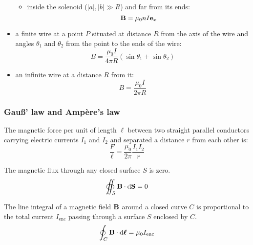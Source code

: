 \documentclass[../../../main.tex]{subfiles}
\begin{document}
\begin{multicols}{2}
\begin{prop}
\begin{itemize}
\begin{itemize}
\begin{center}
\begin{minipage}{\linewidth}
                                    \centering
                                    
                                \end{minipage}
                            \end{center}
                      \item inside the solenoid ($|a|,|b|\gg R$) and far from its ends: $$\boldsymbol{\mathrm{B}}=\mu_0 nI\boldsymbol{\mathrm{e}}_x$$
                  \end{itemize}
            \item a finite wire at a point $P$ situated at distance $R$ from the axis of the wire and angles $\theta_1$ and $\theta_2$ from the point to the ends of the wire: $$B=\frac{\mu_0I}{4\pi R}(\sin\theta_1+\sin\theta_2)$$
                  \begin{center}
                      \begin{minipage}{\linewidth}
                          \centering
                          
                      \end{minipage}
                  \end{center}
            \item an infinite wire at a distance $R$ from it: $$B=\frac{\mu_0I}{2\pi R}$$
        \end{itemize}
    \end{prop}
    \subsubsection{Gau\ss' law and Ampère's law}
    \begin{prop}
        The magnetic force per unit of length $\ell$ between two straight parallel conductors carrying electric currents $I_1$ and $I_2$ and separated a distance $r$ from each other is: $$\frac{F}{\ell}=\frac{\mu_0}{2\pi}\frac{I_1I_2}{r}$$
    \end{prop}
    \begin{law}
        The magnetic flux through any closed surface $S$ is zero.
        $$\oiint_S\boldsymbol{\mathrm{B}}\cdot\dd\boldsymbol{\mathrm{S}}=0$$
    \end{law}
    \begin{law}
        The line integral of a magnetic field $\boldsymbol{\mathrm{B}}$ around a closed curve $C$ is proportional to the total current $I_\text{enc}$ passing through a surface $S$ enclosed by $C$.
        $$\oint_C\boldsymbol{\mathrm{B}}\cdot\dd\boldsymbol{\mathrm{\ell}}=\mu_0I_\text{enc}$$
    \end{law}

\end{multicols}
\end{document}
